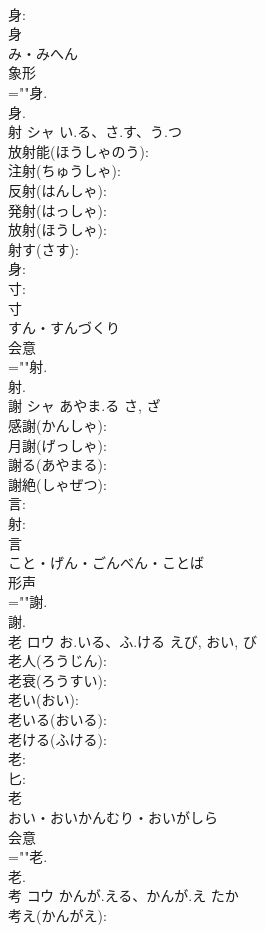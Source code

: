 \documentclass[8pt]{extreport}
\begin{document}
\begin{CJK}{UTF8}{min}
\\	身: 
\\	身	
\\	み・みへん	
\\	象形 
\\	=""身.
\\	身.
\\	射	シャ	い.る、さ.す、う.つ		
\\	放射能(ほうしゃのう): 
\\	注射(ちゅうしゃ): 
\\	反射(はんしゃ): 
\\	発射(はっしゃ): 
\\	放射(ほうしゃ): 
\\	射す(さす): 
\\	身: 
\\	寸: 
\\	寸	
\\	すん・すんづくり	
\\	会意 
\\	=""射.
\\	射.
\\	謝	シャ	あやま.る	さ, ざ	
\\	感謝(かんしゃ): 
\\	月謝(げっしゃ): 
\\	謝る(あやまる): 
\\	謝絶(しゃぜつ): 
\\	言: 
\\	射: 
\\	言	
\\	こと・げん・ごんべん・ことば	
\\	形声 
\\	=""謝.
\\	謝.
\\	老	ロウ	お.いる、ふ.ける	えび, おい, び	
\\	老人(ろうじん): 
\\	老衰(ろうすい): 
\\	老い(おい): 
\\	老いる(おいる): 
\\	老ける(ふける): 
\\	老: 
\\	匕: 
\\	老	
\\	おい・おいかんむり・おいがしら	
\\	会意 
\\	=""老.
\\	老.
\\	考	コウ	かんが.える、かんが.え	たか	
\\	考え(かんがえ): 

\end{CJK}
\end{document}
